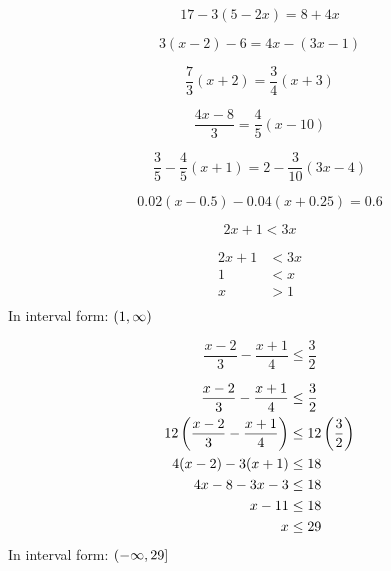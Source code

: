 \documentclass[letterpaper]{exam}
\begin{document}
  \begin{questions}
    

    \question[5]
      \[ 
        17 - 3(5 - 2x) = 8 + 4x
      \]

    \question[5]
      \[
        3(x - 2) - 6 = 4x - (3x - 1)
      \]

    \question[10]
      \[ 
        \frac{7}{3} (x + 2) = \frac{3}{4} (x + 3)
      \]

    \question[10]\label{e:first}
      \[ 
        \frac{4x - 8}{3} = \frac{4}{5} (x - 10)
      \]




    \question[10]
      \[
        \frac{3}{5} - \frac{4}{5} (x + 1) = 2 - \frac{3}{10} (3x - 4)
      \]

    \question[10] 
    \[
      0.02 (x - 0.5) - 0.04 (x + 0.25) = 0.6
    \]

    \question[5]
      \[
        2x + 1 < 3x
      \]

      \begin{solution}
        \begin{align*}
          2x + 1 & < 3x \\
          1      & < x \\
          x      & > 1 \\
        \end{align*}
        In interval form: $\intoo{ 1, \infty }$
    \end{solution}

    \question[10]
      \[ 
        \frac{x - 2}{3} - \frac{x + 1}{4} \leq \frac{3}{2} 
      \]

      \begin{solution}
        \begin{align*}
          \frac{x - 2}{3} - \frac{x + 1}{4}            & \leq \frac{3}{2} \\
          12 \del{ \frac{x - 2}{3} - \frac{x + 1}{4} } & \leq 12 \del{ \frac{3}{2} } \\
          4(x - 2) - 3(x + 1)                          & \leq 18 \\
          4x - 8 - 3x - 3                              & \leq 18 \\
          x - 11                                       & \leq 18 \\
          x                                            & \leq 29 \\
        \end{align*}
        In interval form: $\intoc{ -\infty, 29 }$
      \end{solution}


\end{questions}
\end{document}
